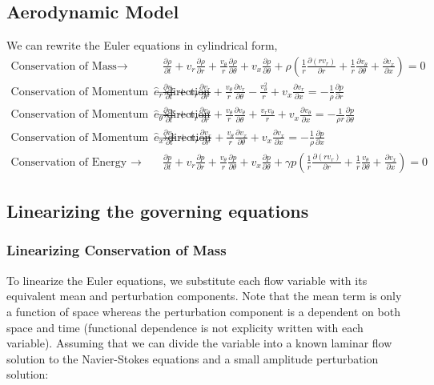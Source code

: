 \documentclass[12pt]{article}
\begin{document}
\subsection{Aerodynamic Model}
We can rewrite the Euler equations in cylindrical form, 
\begin{align*}
\text{Conservation of Mass} \rightarrow& \frac{\partial \rho}{\partial t} + %
v_r \frac{\partial \rho}{\partial r} +
\frac{v_{\theta}   }{r}
\frac{\partial \rho}{\partial \theta} +
v_x \frac{\partial \rho}{\partial \theta} + 
\rho 
\left(
\frac{1}{r} \frac{\partial (rv_r)	}{\partial r} +
\frac{1}{r}	\frac{\partial v_{\theta}}{\partial \theta} +
\frac{\partial v_x}{\partial x}
\right) 
= 0 \\%
\text{Conservation of Momentum in the $\hat{e}_r$ direction} \rightarrow&\frac{\partial v_r}{\partial t} + 
v_r \frac{\partial v_r}{\partial r} +
\frac{v_{\theta}  }{r}
\frac{\partial v_r}{\partial \theta}- \frac{v_{\theta}^2}{r}+ 
v_x \frac{\partial v_r}{\partial x} 
= -\frac{1}{\rho} \frac{\partial p}{\partial r}\\  \text{Conservation of Momentum in the $\hat{e}_{\theta}$ direction} \rightarrow& 
\frac{\partial v_{\theta}}{\partial t} + 
v_r \frac{\partial v_{\theta}}{\partial r} +
\frac{v_{\theta}}{r}
\frac{\partial v_{\theta}}{\partial \theta} +
\frac{v_r v_{\theta}}{r}+ 
v_x \frac{\partial v_{\theta}}{\partial x} 
= -\frac{1}{\rho r} \frac{\partial p}{\partial \theta}\\ 
\text{Conservation of Momentum in the $\hat{e}_x$ direction} \rightarrow&
\frac{\partial v_{x}}{\partial t} + 
v_r 
\frac{\partial v_x}{\partial r} +
\frac{v_{\theta}}{r}
\frac{\partial v_x}{\partial \theta}+ 
v_x \frac{\partial v_x}{\partial x} 
= 
-\frac{1}{\rho } 
\frac{\partial p}{\partial x}\\  \text{Conservation of Energy } \rightarrow& 
\frac{\partial p }{\partial t} +
v_r 
\frac{\partial p}{\partial r} +
\frac{v_{\theta}}{r}
\frac{\partial p}{\partial \theta} +
v_x \frac{\partial p}{\partial \theta} + 
\gamma p 
\left(
\frac{1}{r}\frac{\partial (rv_r)}{\partial r} +
\frac{1}{r}\frac{v_{\theta}}{\partial \theta} +
\frac{\partial v_x}{\partial x}
\right) = 0
\end{align*}
\subsection{Linearizing the governing equations}
\subsubsection{Linearizing Conservation of Mass}
To linearize the Euler equations, we substitute each flow variable with its equivalent mean and perturbation components. Note that the mean term is only a function of space whereas the perturbation component is a dependent on both space and time (functional dependence is not explicity written with each variable). Assuming that we can divide the variable into a known laminar flow solution to the Navier-Stokes equations and a small amplitude perturbation solution:
\end{document}
